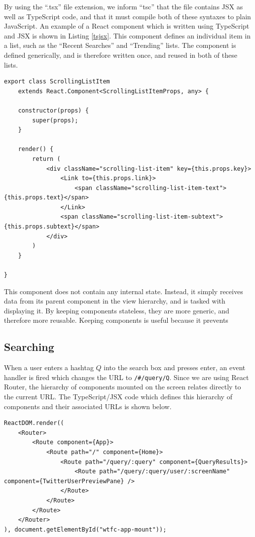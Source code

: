 \documentclass{l4proj}
\newcommand{\code}[1]{\texttt{#1}}
\begin{document}
By using the ``.tsx'' file extension, we inform ``tsc'' that the file contains JSX as well as TypeScript code, and that it must compile both of these syntaxes to plain JavaScript. An example of a React component which is written using TypeScript and JSX is shown in Listing \ref{tsjsx}. This component defines an individual item in a list, such as the ``Recent Searches'' and ``Trending'' lists. The component is defined generically, and is therefore written once, and reused in both of these lists.

\begin{lstlisting}[caption={Definition of a reusable list-item component using React, JSX, and TypeScript},label=tsjsx]
export class ScrollingListItem 
    extends React.Component<ScrollingListItemProps, any> {

    constructor(props) {
        super(props);
    }

    render() {
        return (
            <div className="scrolling-list-item" key={this.props.key}>
                <Link to={this.props.link}>
                    <span className="scrolling-list-item-text">{this.props.text}</span>
                </Link>
                <span className="scrolling-list-item-subtext">{this.props.subtext}</span>
            </div>
        )
    }

}
\end{lstlisting}

This component does not contain any internal state. Instead, it simply receives data from its parent component in the view hierarchy, and is tasked with displaying it. By keeping components stateless, they are more generic, and therefore more reusable. Keeping components is useful because it prevents 

        \subsection{Searching}
        When a user enters a hashtag $Q$ into the search box and presses enter, an event handler is fired which changes the URL to \code{/\#/query/Q}. Since we are using React Router, the hierarchy of components mounted on the screen relates directly to the current URL. The TypeScript/JSX code which defines this hierarchy of components and their associated URLs is shown below.
        
\begin{lstlisting}[caption=Definition of the hierarchy of React component and how they map to the URL.,label=routerdef]
ReactDOM.render((
    <Router>
        <Route component={App}>
            <Route path="/" component={Home}>
                <Route path="/query/:query" component={QueryResults}>
                    <Route path="/query/:query/user/:screenName" component={TwitterUserPreviewPane} />
                </Route>
            </Route>
        </Route>
    </Router>
), document.getElementById("wtfc-app-mount"));
\end{lstlisting}
         
\end{document}
